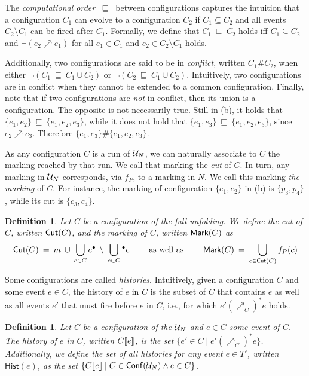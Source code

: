 \documentclass[11pt,a4paper]{article}
\newtheorem{definition}[theorem]{Definition}
\newcommand{\hist}[1]{\ensuremath{\mathsf{Hist}(#1)}}
\newcommand{\conf}[1]{\ensuremath{\mathsf{Conf}(#1)}}
\newcommand{\confl}{\ensuremath{\mathord{\#}}}
\newcommand{\evolves}{{\ensuremath{\ \sqsubseteq \ }}}
\begin{document}
\label{pag:evolves} The \emph{computational order} $\evolves$ between
configurations captures the intuition that a configuration $C_1$ can evolve to
a configuration $C_2$ if $C_1 \subseteq C_2$ and all events $C_2 \setminus C_1$
can be fired after $C_1$.  Formally, we define that $C_1 \evolves C_2$ holds
iff $C_1 \subseteq C_2$ and $\lnot (e_2 \nearrow e_1)$ for all $e_1 \in C_1$
and $e_2 \in C_2 \setminus C_1$ holds.

\label{pag:conflict} Additionally, two configurations are said to be in
\emph{conflict}, written $C_1 \confl C_2$, when either $\lnot (C_1 \evolves C_1
\cup C_2)$ or $\lnot (C_2 \evolves C_1 \cup C_2)$.  Intuitively, two
configurations are in conflict when they cannot be extended to a common
configuration.  Finally, note that if two configurations are \emph{not} in
conflict, then its union is a configuration.  The opposite is not necessarily
true.  Still in  (b), it holds that $\{e_1, e_2\} \evolves \{e_1,
e_2, e_3\}$, while it does not hold that $\{e_1, e_3\} \evolves \{e_1, e_2,
e_3\}$, since $e_2 \nearrow e_3$.  Therefore $\{e_1, e_3\} \confl \{e_1, e_2,
e_3\}$.

As any configuration $C$ is a run of $\mathcal{U}_{N}$, we can naturally associate to
$C$ the marking reached by that run.  We call that marking the \emph{cut} of
$C$.  In turn, any marking in $\mathcal{U}_{N}$ corresponds, via $f_P$, to a marking in
$N$.  We call this marking \emph{the marking} of $C$. For instance, the marking
of configuration $\{e_1, e_2\}$ in  (b) is $\{p_3, p_4\}$, while
its cut is $\{c_3, c_4\}$.

\begin{definition}
Let $C$ be a configuration of the full unfolding.  We define
the \emph{cut} of $C$, written $\mathsf{Cut }{(C)}$, and the \emph{marking} of $C$, written
$\mathsf{Mark }{(C)}$ as $$\mathsf{Cut }{(C)} \: = \: m \: \cup \: \bigcup_{e \in C} e^\bullet \:
\setminus \: \bigcup_{e \in C} {}^\bullet e \qquad \mbox{ as well as } \qquad
\mathsf{Mark }{(C)} \: = \: \bigcup_{c \in \mathsf{Cut }{(C)}} f_P (c)$$
\end{definition}

Some configurations are called \emph{histories}.  Intuitively, given a
configuration $C$ and some event $e \in C$, the history of $e$ in $C$ is the
subset of $C$ that contains $e$ as well as all events $e'$ that must fire
before $e$ in $C$, i.e., for which $e' (\nearrow_C)^* e$ holds.

\begin{definition}
\label{def:history}
Let $C$ be a configuration of the $\mathcal{U}_{N}$ and $e \in C$ some event of $C$.
The \emph{history} of $e$ in $C$, written $C [\![ e]\!]$, is the set $\{e' \in C
\mid e' (\nearrow_C)^* e\}$.  Additionally, we define the set of all histories
for any event $e \in T'$, written $\hist e$, as the set $\{C \sem e \mid C \in
\conf{\unf N} \land e \in C\}$.
\end{definition}
\end{document}
